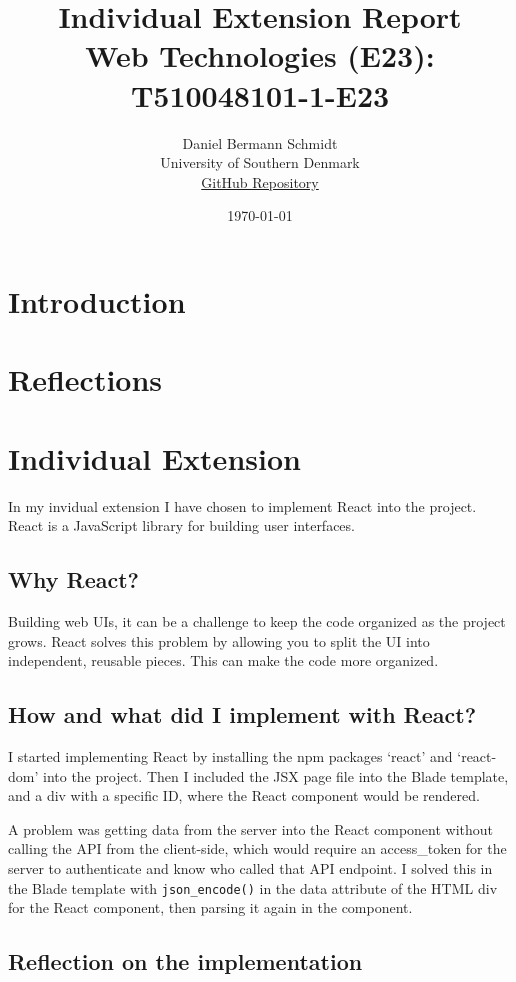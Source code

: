 \documentclass[letterpaper,twocolumn]{article}
\title{Individual Extension Report\\Web Technologies (E23): T510048101-1-E23}
\author{Daniel Bermann Schmidt\\University of Southern Denmark\\\href{https://github.com/Kururururururururu/MovielibLaravel/tree/Daniel_individuel_part}{GitHub Repository}}
\date{\today}
\begin{document}
\maketitle

\section{Introduction}

\section{Reflections}

\section{Individual Extension}

In my invidual extension I have chosen to implement React into the project.
React is a JavaScript library for building user interfaces.

\subsection{Why React?}

Building web UIs, it can be a challenge to keep the code organized as the project grows.
React solves this problem by allowing you to split the UI into independent, reusable pieces.
This can make the code more organized.

\subsection{How and what did I implement with React?}

I started implementing React by installing the npm packages `react' and `react-dom' into the project.
Then I included the JSX page file into the Blade template, and a div with a specific ID, where the React component would be rendered.

A problem was getting data from the server into the React component without calling the API from the client-side, which would require an access\_token for the server to authenticate and know who called that API endpoint.
I solved this in the Blade template with \texttt{json_encode()} in the data attribute of the HTML div for the React component, then parsing it again in the component.

\subsection{Reflection on the implementation}
\end{document}
